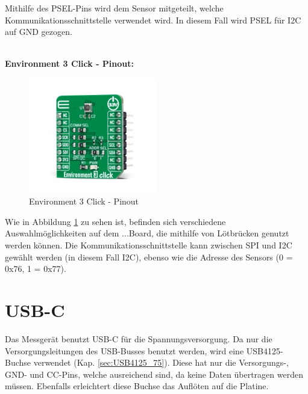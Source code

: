 \begin{inhalt}
Mithilfe des PSEL-Pins wird dem Sensor mitgeteilt, welche Kommunikationsschnittstelle verwendet wird. In diesem Fall wird PSEL für I2C auf GND gezogen.

\bigskip \\

\textbf{Environment 3 Click - Pinout:}

\begin{figure}[!htb]
\centering
\includegraphics[width=0.5\textwidth]{files/Tobias/pics/Pinout/environment-3-click-thickbox_default-2.jpg}
\caption[Display - Pinout]{Environment 3 Click - Pinout}
\label{fig:BME688_Pinout}
\end{figure}

Wie in Abbildung \ref{fig:BME688_Pinout} zu sehen ist, befinden sich verschiedene Auswahlmöglichkeiten auf dem ...Board, die mithilfe von Lötbrücken genutzt werden können. Die Kommunikationsschnittstelle kann zwischen SPI und I2C gewählt werden (in diesem Fall I2C), ebenso wie die Adresse des Sensors (0 = 0x76, 1 = 0x77). 





      \section{USB-C}

      Das Messgerät benutzt USB-C für die Spannungsversorgung. Da nur die Versorgungsleitungen des USB-Busses benutzt werden, wird eine USB4125-Buchse verwendet (Kap. \ref{sec:USB4125_75}). Diese hat nur die Versorgungs-, GND- und CC-Pins, welche ausreichend sind, da keine Daten übertragen werden müssen. Ebenfalls erleichtert diese Buchse das Auflöten auf die Platine.


\end{inhalt}
